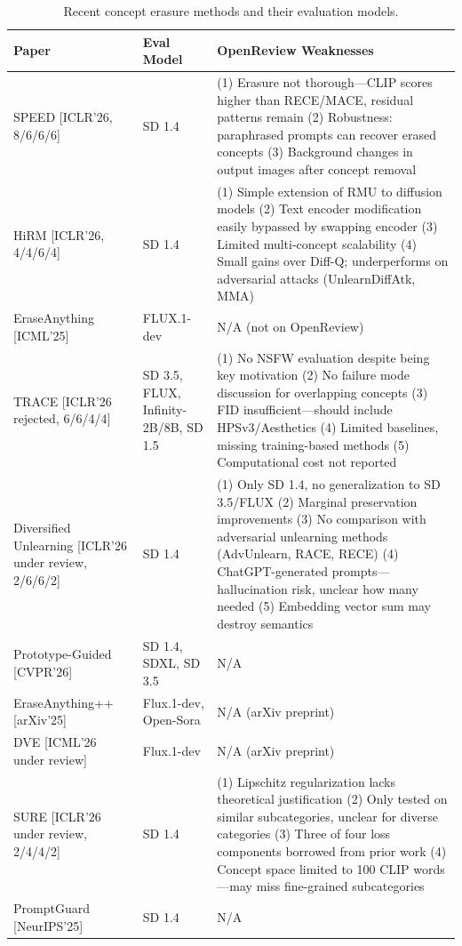 \documentclass[11pt,a4paper]{article}
\begin{document}
\begin{table}[H]
\centering
\caption{Recent concept erasure methods and their evaluation models.}
\renewcommand{\arraystretch}{1.5}
\begin{tabularx}{\textwidth}{@{} p{2.2cm} p{2.5cm} X @{}}
\toprule
\textbf{Paper} & \textbf{Eval Model} & \textbf{OpenReview Weaknesses} \\
\midrule
SPEED \scriptsize{[ICLR'26, 8/6/6/6]} & SD 1.4 & (1) Erasure not thorough---CLIP scores higher than RECE/MACE, residual patterns remain (2) Robustness: paraphrased prompts can recover erased concepts (3) Background changes in output images after concept removal \\
HiRM \scriptsize{[ICLR'26, 4/4/6/4]} & SD 1.4 & (1) Simple extension of RMU to diffusion models (2) Text encoder modification easily bypassed by swapping encoder (3) Limited multi-concept scalability (4) Small gains over Diff-Q; underperforms on adversarial attacks (UnlearnDiffAtk, MMA) \\
EraseAnything \scriptsize{[ICML'25]} & FLUX.1-dev & N/A (not on OpenReview) \\
TRACE \scriptsize{[ICLR'26 rejected, 6/6/4/4]} & SD 3.5, FLUX, Infinity-2B/8B, SD 1.5 & (1) No NSFW evaluation despite being key motivation (2) No failure mode discussion for overlapping concepts (3) FID insufficient---should include HPSv3/Aesthetics (4) Limited baselines, missing training-based methods (5) Computational cost not reported \\
Diversified Unlearning \scriptsize{[ICLR'26 under review, 2/6/6/2]} & SD 1.4 & (1) Only SD 1.4, no generalization to SD 3.5/FLUX (2) Marginal preservation improvements (3) No comparison with adversarial unlearning methods (AdvUnlearn, RACE, RECE) (4) ChatGPT-generated prompts---hallucination risk, unclear how many needed (5) Embedding vector sum may destroy semantics \\
Prototype-Guided \scriptsize{[CVPR'26]} & SD 1.4, SDXL, SD 3.5 & N/A \\
EraseAnything++ \scriptsize{[arXiv'25]} & Flux.1-dev, Open-Sora & N/A (arXiv preprint) \\
DVE \scriptsize{[ICML'26 under review]} & Flux.1-dev & N/A (arXiv preprint) \\
SURE \scriptsize{[ICLR'26 under review, 2/4/4/2]} & SD 1.4 & (1) Lipschitz regularization lacks theoretical justification (2) Only tested on similar subcategories, unclear for diverse categories (3) Three of four loss components borrowed from prior work (4) Concept space limited to 100 CLIP words---may miss fine-grained subcategories \\
PromptGuard \scriptsize{[NeurIPS'25]} & SD 1.4 & N/A \\
\bottomrule
\end{tabularx}
\label{tab:concept_erasure}
\end{table}
\end{document}
